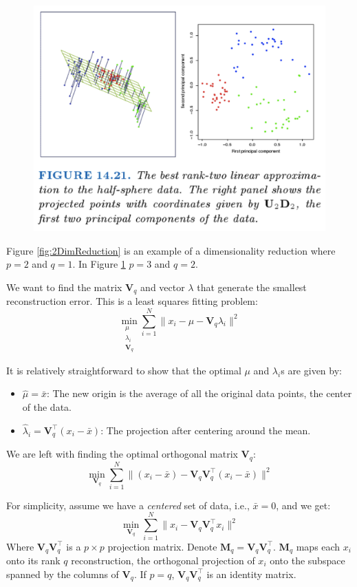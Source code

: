 \documentclass[a4paper]{article}
\begin{document}
\begin{figure}
\centering
\includegraphics[width=1.0\textwidth]{ThreeDimReduction.png}
\caption{\label{fig:3DimReduction}}
\end{figure}

Figure \ref{fig:2DimReduction} is an example of a dimensionality reduction where $p=2$ and $q=1$. In Figure \ref{fig:3DimReduction} $p=3$ and $q=2$. 

We want to find the matrix $\mathbf{V}_q$ and vector $\lambda$ that generate the smallest reconstruction error. This is a least squares fitting problem:
$$\min_{\substack{
   \mu \\
   {\lambda_i} \\
   \mathbf{V}_q
  }} \sum_{i=1}^N \| x_i-\mu-\mathbf{V}_q\lambda_i \|^2$$
  
It is relatively straightforward to show that the optimal $\mu$ and $\lambda_i$s are given by:
\begin{itemize}
\item $\hat{\mu}=\bar{x}$: The new origin is the average of all the original data points, the center of the data.
\item $\hat{\lambda}_i=\mathbf{V}_q^\top(x_i-\bar{x})$: The projection after centering around the mean.
\end{itemize}

We are left with finding the optimal orthogonal matrix $\mathbf{V}_q$:
$$\min_{\mathbf{V}_q} \sum_{i=1}^N \| (x_i-\bar{x})-\mathbf{V}_q\mathbf{V}_q^\top(x_i-\bar{x})\|^2$$

For simplicity, assume we have a \textit{centered} set of data, i.e., $\bar{x}=0$, and we get:
$$\min_{\mathbf{V}_q} \sum_{i=1}^N \| x_i -\mathbf{V}_q\mathbf{V}_q^\top x_i \|^2$$
Where $\mathbf{V}_q\mathbf{V}_q^\top$ is a $p\times p$ projection matrix. Denote $\mathbf{M}_q=\mathbf{V}_q\mathbf{V}_q^\top$. $\mathbf{M}_q$ maps each $x_i$ onto its rank $q$ reconstruction, the orthogonal projection of $x_i$ onto the subspace spanned by the columns of $\mathbf{V}_q$. If $ p = q $, $\mathbf{V}_q\mathbf{V}_q^\top$  is an identity matrix.
\end{document}
